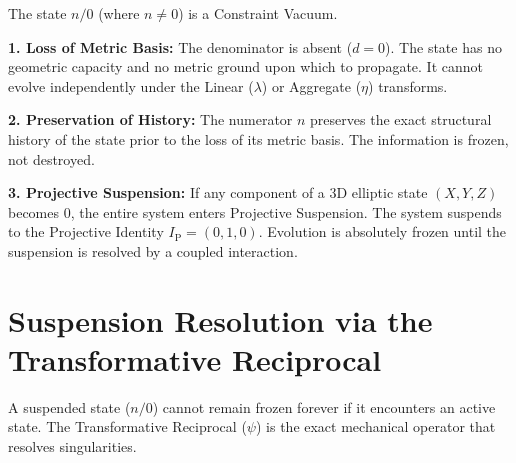 \documentclass[11pt, letterpaper]{article}
\newcommand{\aop}{\eta}
\newcommand{\lop}{\lambda}
\newcommand{\psiop}{\psi}
\newcommand{\IP}{I_{\mathrm{P}}}
\begin{document}
\begin{definition}\label{def:constraint_vacuum}
\begin{rsbox}
The state $n/0$ (where $n \neq 0$) is a Constraint Vacuum.

\textbf{1. Loss of Metric Basis:}
The denominator is absent ($d=0$). The state has no geometric capacity and no metric ground upon which to propagate. It cannot evolve independently under the Linear ($\lop$) or Aggregate ($\aop$) transforms.

\textbf{2. Preservation of History:}
The numerator $n$ preserves the exact structural history of the state prior to the loss of its metric basis. The information is frozen, not destroyed.

\textbf{3. Projective Suspension:}
If any component of a 3D elliptic state $(X, Y, Z)$ becomes $0$, the entire system enters Projective Suspension. The system suspends to the Projective Identity $\IP = (0, 1, 0)$. Evolution is absolutely frozen until the suspension is resolved by a coupled interaction.
\end{rsbox}
\end{definition}

\section{Suspension Resolution via the Transformative Reciprocal}

A suspended state ($n/0$) cannot remain frozen forever if it encounters an active state. The Transformative Reciprocal ($\psiop$) is the exact mechanical operator that resolves singularities.
\end{document}
